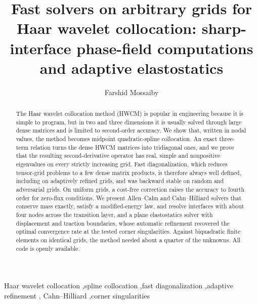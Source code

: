 \documentclass[preprint,12pt]{elsarticle}
\theoremstyle{remark}
\begin{document}
\begin{frontmatter}
\title{Fast solvers on arbitrary grids for Haar wavelet collocation:
sharp-interface phase-field computations and adaptive elastostatics}

\author[inst1]{Farshid Mossaiby}

\begin{abstract}
The Haar wavelet collocation method (HWCM) is popular in engineering because it is simple to program,
but in two and three dimensions it is usually solved through large dense matrices and is
limited to second-order accuracy. We show that, written in nodal values, the method becomes midpoint
quadratic-spline collocation. An exact three-term relation turns the dense HWCM matrices into tridiagonal
ones, and we prove that the resulting second-derivative operator has real, simple and nonpositive
eigenvalues on every strictly increasing grid. Fast diagonalization, which reduces tensor-grid problems to
a few dense matrix products, is therefore always well defined, including on adaptively refined grids, and
was backward stable on random and adversarial grids. On uniform grids, a cost-free correction raises the
accuracy to fourth order for zero-flux conditions. We present Allen--Cahn and Cahn--Hilliard solvers that
conserve mass exactly, satisfy a modified-energy law, and resolve interfaces with about four nodes across
the transition layer, and a plane elastostatics solver with displacement and traction boundaries, whose
automatic refinement recovered the optimal convergence rate at the tested corner singularities. Against
biquadratic finite elements on identical grids, the method needed about a quarter of the unknowns. All
code is openly available.
\end{abstract}

\begin{keyword}
Haar wavelet collocation \sep spline collocation \sep fast diagonalization \sep adaptive refinement \sep
Cahn--Hilliard \sep corner singularities
\end{keyword}
\end{frontmatter}

\end{document}
